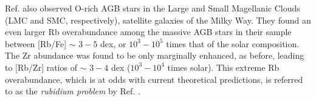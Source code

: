 Ref. \cite{Garcia2009} also observed O-rich AGB stars in the Large and Small Magellanic Clouds (LMC and SMC, respectively), satellite galaxies of the Milky Way. They found an even larger Rb overabundance among the massive AGB stars in their sample between [Rb/Fe] $\sim$ $3-5$ dex, or $10^{3}-10^{5}$ times that of the solar composition. The Zr abundance was found to be only marginally enhanced, as before, leading to [Rb/Zr] ratios of $\sim$ $3-4$ dex ($10^{3}-10^{4}$ times solar). This extreme Rb overabundance, which is at odds with current theoretical predictions, is referred to as the \emph{rubidium problem} by Ref. \cite{Garcia2009}.


